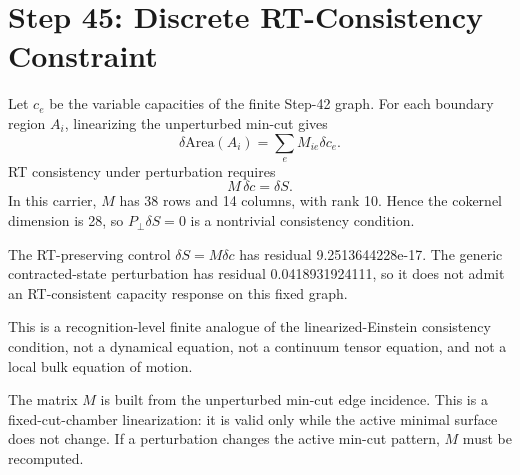 \documentclass[11pt]{article}
\begin{document}
\section*{Step 45: Discrete RT-Consistency Constraint}

Let \(c_e\) be the variable capacities of the finite Step-42 graph. For each
boundary region \(A_i\), linearizing the unperturbed min-cut gives
\[
\delta \mathrm{Area}(A_i)=\sum_e M_{ie}\delta c_e.
\]
RT consistency under perturbation requires
\[
M\,\delta c = \delta S.
\]
In this carrier, \(M\) has 38 rows and 14
columns, with rank 10. Hence the cokernel dimension is
28, so \(P_\perp\delta S=0\) is a nontrivial
consistency condition.

The RT-preserving control \(\delta S=M\delta c\) has residual
9.2513644228e-17. The generic contracted-state
perturbation has residual 0.0418931924111, so it
does not admit an RT-consistent capacity response on this fixed graph.

This is a recognition-level finite analogue of the linearized-Einstein
consistency condition, not a dynamical equation, not a continuum tensor
equation, and not a local bulk equation of motion.

The matrix \(M\) is built from the unperturbed min-cut edge incidence. This is
a fixed-cut-chamber linearization: it is valid only while the active minimal
surface does not change. If a perturbation changes the active min-cut pattern,
\(M\) must be recomputed.
\end{document}
